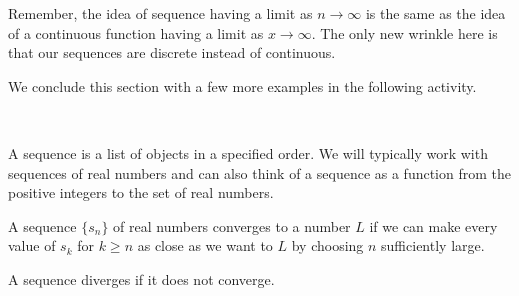 \vspace*{5pt}
\nin {}
\vspace*{1pt}

Remember, the idea of sequence having a limit as $n \to \infty$ is the same as the idea of a continuous function having a limit as $x \to \infty$. The only new wrinkle here is that our sequences are discrete instead of continuous.

We conclude this section with a few more examples in the following activity.



\vfill \ 
\newpage


\begin{summary}
\item A sequence is a list of objects in a specified order. We will typically work with sequences of real numbers and can also think of a sequence as a function from the positive integers to the set of real numbers.
\item A sequence $\{s_n\}$ of real numbers converges to a number $L$ if we can make every value of  $s_k$ for $k \ge n$ as close as we want to $L$ by choosing $n$ sufficiently large.
\item A sequence diverges if it does not converge.
\end{summary}

\nin \hrulefill



\clearpage
